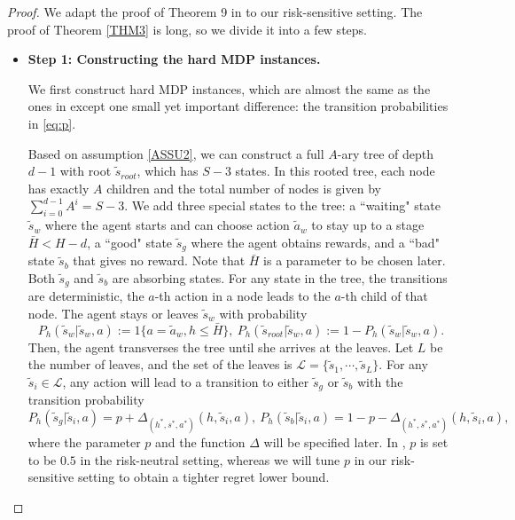 \documentclass[11pt]{article}
\newcommand{\1}{\mathbbm{1}}
\begin{document}
\begin{proof} We adapt the proof of Theorem 9 in \cite{domingues2021episodic} to our risk-sensitive setting. The proof of Theorem  \ref{THM3} is long, so we divide it into a few steps. 


\begin{itemize}
\item \textbf{Step 1: Constructing the hard MDP instances.}

We first construct hard MDP instances, which are almost the same as the ones in \cite{domingues2021episodic} except one small yet important difference: the transition probabilities in \eqref{eq:p}.  

Based on assumption \ref{ASSU2}, we can construct a full $A$-ary tree of depth $d-1$ with root $\tilde{s}_{root}$, which has $S-3$ states. In this rooted tree, each node has exactly $A$ children and the total number of nodes is given by $\sum_{i=0}^{d-1}A^i=S-3$. We add three special states to the tree: a ``waiting" state $\tilde{s}_w$ where the agent starts and can choose action $\tilde{a}_w$ to stay up to a stage $\bar{H}< H-d$, a ``good" state $\tilde{s}_g$ where the agent obtains rewards, and a ``bad" state $\tilde{s}_b$ that gives no reward. Note that $\bar{H}$ is a parameter to be chosen later. Both $\tilde{s}_g$ and $\tilde{s}_b$ are absorbing states. For any state in the tree, the transitions are deterministic, the $a$-th action in a node leads to the $a$-th child of that node. The agent stays or leaves $\tilde{s}_w$ with probability
\begin{equation*}
P_h(\tilde{s}_w\vert \tilde{s}_w,a):=1\{a=\tilde{a}_w,h\leq \bar{H}\},\ P_h(\tilde s_{root}\vert \tilde{s}_w,a):=1-P_h(\tilde{s}_w\vert \tilde{s}_w,a).
\end{equation*}
Then, the agent transverses the tree until she arrives at the leaves. Let $L$ be the number of leaves, and the set of the leaves is $\mathcal{L}=\{\tilde{s}_1,\cdots,\tilde{s}_L\}$. For any $\tilde{s}_i\in \mathcal{L}$, any action will lead to a transition to either $\tilde{s}_g$ or $\tilde{s}_b$ with the transition probability
\begin{equation} \label{eq:p}
P_h(\tilde{s}_g\vert \tilde{s}_i,a)=p+\Delta_{(h^*,s^*,a^*)}(h,\tilde{s}_i,a),\ P_h(\tilde{s}_b\vert \tilde{s}_i,a)=1-p-\Delta_{(h^*,s^*,a^*)}(h,\tilde{s}_i,a),
\end{equation}
where the parameter $p$ and the function $\Delta$ will be specified later. In \cite{domingues2021episodic}, $p$ is set to be $0.5$ in the risk-neutral setting, whereas we will tune $p$ in our risk-sensitive setting to obtain a tighter regret lower bound.  


\end{itemize}
\end{proof}
\end{document}
